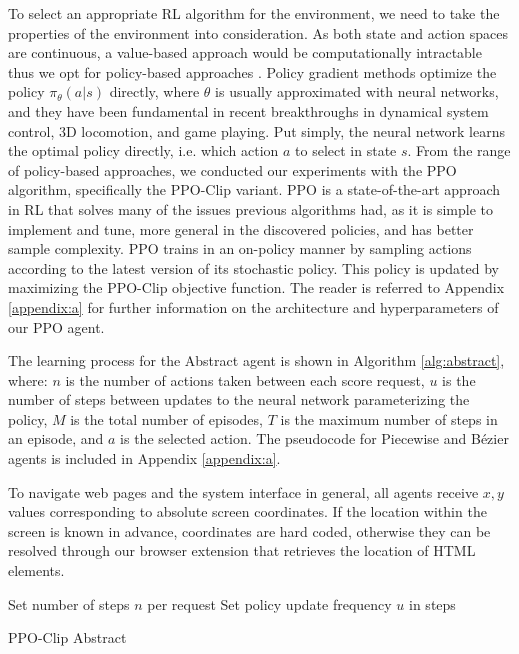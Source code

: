 To select an appropriate \gls{RL} algorithm for the environment, we need to take the properties of the environment into consideration.
As both state and action spaces are continuous, a value-based approach would be computationally intractable thus we opt for policy-based approaches \cite{sutton1999policy}.
Policy gradient methods optimize the policy $\pi_\theta(a|s)$ directly, where $\theta$ is usually approximated with neural networks, and they have been fundamental in recent breakthroughs in dynamical system control, 3D locomotion, and game playing.
Put simply, the neural network learns the optimal policy directly, i.e. which action $a$ to select in state $s$.
From the range of policy-based approaches, we conducted our experiments with the \gls{PPO} algorithm, specifically the PPO-Clip variant.
\gls{PPO} \cite{schulman2017proximal} is a state-of-the-art approach in \gls{RL} that solves many of the issues previous algorithms had, as it is simple to implement and tune, more general in the discovered policies, and has better sample complexity.
\gls{PPO} trains in an on-policy manner by sampling actions according to the latest version of its stochastic policy.
This policy is updated by maximizing the PPO-Clip objective function.
The reader is referred to Appendix \ref{appendix:a} for further information on the architecture and hyperparameters of our PPO agent.

The learning process for the Abstract agent is shown in Algorithm \ref{alg:abstract}, where: $n$ is the number of actions taken between each score request, $u$ is the number of steps between updates to the neural network parameterizing the policy, $M$ is the total number of episodes, $T$ is the maximum number of steps in an episode, and $a$ is the selected action.
The pseudocode for Piecewise and Bézier agents is included in Appendix \ref{appendix:a}.

To navigate web pages and the system interface in general, all agents receive $x,y$ values corresponding to absolute screen coordinates.
If the location within the screen is known in advance, coordinates are hard coded, otherwise they can be resolved through our browser extension that retrieves the location of HTML elements.

\begin{algorithm}
\SetAlgoLined
 Set number of steps $n$ per request\;
 Set policy update frequency $u$ in steps\;
 \caption{PPO-Clip Abstract}
 \label{alg:abstract}
\end{algorithm}

